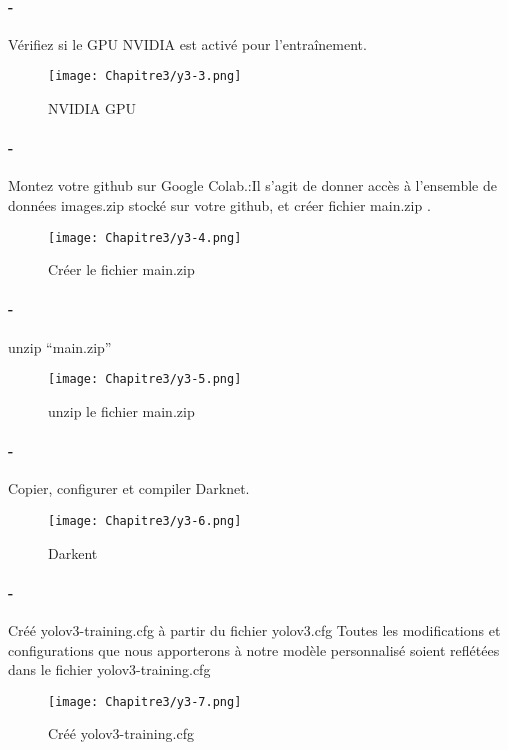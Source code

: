       \paragraph{-} Vérifiez si le GPU NVIDIA est activé pour l'entraînement.
         \begin{figure}[H]
              \centering
              \texttt{[image: Chapitre3/y3-3.png]}
              \caption{NVIDIA GPU}
              \label{y3-3}
              \end{figure} 
          
         \paragraph{-} Montez votre github sur Google Colab.:Il s'agit de donner accès à l'ensemble de données images.zip stocké sur  votre github, et créer fichier main.zip .  
         \begin{figure}[H]
               \centering
               \texttt{[image: Chapitre3/y3-4.png]}
               \caption{ Créer le fichier main.zip}
               \label{y3-4}
               \end{figure} 
          
      \paragraph{-} unzip “main.zip” 
      \begin{figure}[H]
           \centering
           \texttt{[image: Chapitre3/y3-5.png]}
           \caption{ unzip le fichier main.zip}
           \label{y3-5}
           \end{figure} 
          
      \paragraph{-}  Copier, configurer et compiler Darknet.
      \begin{figure}[H]
           \centering
           \texttt{[image: Chapitre3/y3-6.png]}
           \caption{Darkent}
           \label{y3-6}
           \end{figure}  

      \paragraph{-} Créé  yolov3-training.cfg à partir du fichier yolov3.cfg Toutes les modifications et configurations que nous apporterons à notre modèle personnalisé soient reflétées dans le fichier yolov3-training.cfg
      \begin{figure}[H]
           \centering
           \texttt{[image: Chapitre3/y3-7.png]}
           \caption{Créé  yolov3-training.cfg}
           \label{y3-7}
           \end{figure}
